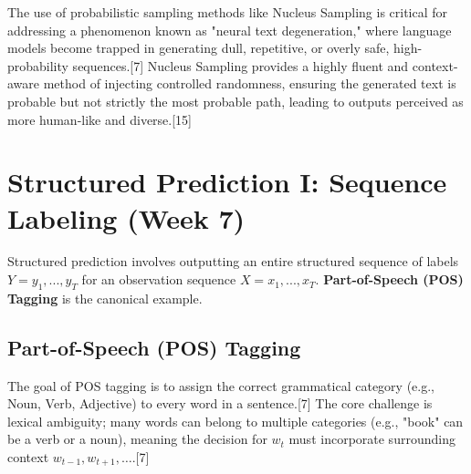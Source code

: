 \documentclass{article}
\begin{document}
The use of probabilistic sampling methods like Nucleus Sampling is critical for addressing a phenomenon known as "neural text degeneration," where language models become trapped in generating dull, repetitive, or overly safe, high-probability sequences.[7] Nucleus Sampling provides a highly fluent and context-aware method of injecting controlled randomness, ensuring the generated text is probable but not strictly the most probable path, leading to outputs perceived as more human-like and diverse.[15]

\begin{table}[h!]
\centering
\caption{Decoding Strategy Comparison}
\end{table}

\section{Structured Prediction I: Sequence Labeling (Week 7)}

Structured prediction involves outputting an entire structured sequence of labels $Y = y_1,..., y_T$ for an observation sequence $X = x_1,..., x_T$. \textbf{Part-of-Speech (POS) Tagging} is the canonical example.

\subsection{Part-of-Speech (POS) Tagging}

The goal of POS tagging is to assign the correct grammatical category (e.g., Noun, Verb, Adjective) to every word in a sentence.[7] The core challenge is lexical ambiguity; many words can belong to multiple categories (e.g., "book" can be a verb or a noun), meaning the decision for $w_t$ must incorporate surrounding context $w_{t-1}, w_{t+1}, \dots$.[7]
\end{document}
